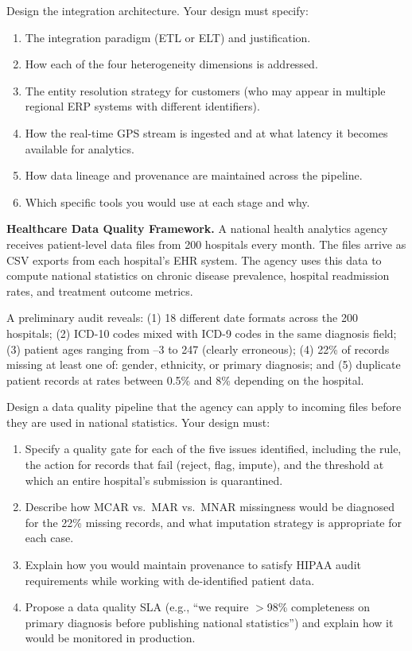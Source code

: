 Design the integration architecture. Your design must specify:
\begin{enumerate}[label=(\alph*)]
  \item The integration paradigm (ETL or ELT) and justification.
  \item How each of the four heterogeneity dimensions is addressed.
  \item The entity resolution strategy for customers (who may appear
        in multiple regional ERP systems with different identifiers).
  \item How the real-time GPS stream is ingested and at what latency
        it becomes available for analytics.
  \item How data lineage and provenance are maintained across the pipeline.
  \item Which specific tools you would use at each stage and why.
\end{enumerate}

\dpr \textbf{Healthcare Data Quality Framework.}
A national health analytics agency receives patient-level data files
from 200 hospitals every month. The files arrive as CSV exports from
each hospital's EHR system. The agency uses this data to compute
national statistics on chronic disease prevalence, hospital readmission
rates, and treatment outcome metrics.

A preliminary audit reveals: (1) 18 different date formats across the
200 hospitals; (2) ICD-10 codes mixed with ICD-9 codes in the same
diagnosis field; (3) patient ages ranging from --3 to 247 (clearly
erroneous); (4) 22\% of records missing at least one of: gender,
ethnicity, or primary diagnosis; and (5) duplicate patient records at
rates between 0.5\% and 8\% depending on the hospital.

Design a data quality pipeline that the agency can apply to incoming
files before they are used in national statistics. Your design must:
\begin{enumerate}[label=(\alph*)]
  \item Specify a quality gate for each of the five issues identified,
        including the rule, the action for records that fail (reject,
        flag, impute), and the threshold at which an entire hospital's
        submission is quarantined.
  \item Describe how MCAR vs.\ MAR vs.\ MNAR missingness would be
        diagnosed for the 22\% missing records, and what imputation
        strategy is appropriate for each case.
  \item Explain how you would maintain provenance to satisfy HIPAA
        audit requirements while working with de-identified patient data.
  \item Propose a data quality SLA (e.g., ``we require $>$98\%
        completeness on primary diagnosis before publishing national
        statistics'') and explain how it would be monitored in
        production.
\end{enumerate}

